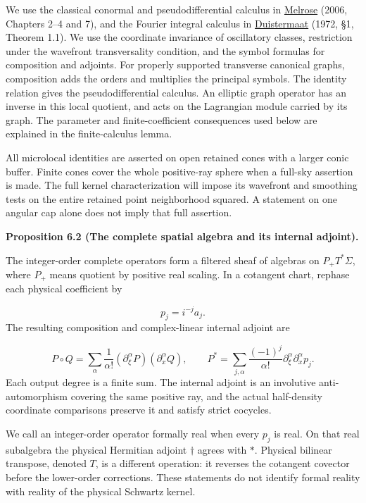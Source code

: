 \documentclass[
  english,
  11pt,
  reqno]{amsart}
\makeatletter
\newcommand{\pandocstatementheading}[1]{%
  \par\addpenalty{\@beginparpenalty}%
  \addvspace{.5\baselineskip plus .2\baselineskip minus .2\baselineskip}%
  {\normalfont\bfseries #1\par}%
  \nobreak\@afterindenttrue\@afterheading
}
\makeatother
\begin{document}
We use the classical conormal and pseudodifferential calculus in
\hyperref[ref-Melrose2006]{Melrose} (2006, Chapters 2--4 and 7), and the
Fourier integral calculus in
\hyperref[ref-Duistermaat1972FIO]{Duistermaat} (1972, §1, Theorem 1.1).
We use the coordinate invariance of oscillatory classes, restriction
under the wavefront transversality condition, and the symbol formulas
for composition and adjoints. For properly supported transverse
canonical graphs, composition adds the orders and multiplies the
principal symbols. The identity relation gives the pseudodifferential
calculus. An elliptic graph operator has an inverse in this local
quotient, and acts on the Lagrangian module carried by its graph. The
parameter and finite-coefficient consequences used below are explained
in the finite-calculus lemma.

All microlocal identities are asserted on open retained cones with a
larger conic buffer. Finite cones cover the whole positive-ray sphere
when a full-sky assertion is made. The full kernel characterization will
impose its wavefront and smoothing tests on the entire retained point
neighborhood squared. A statement on one angular cap alone does not
imply that full assertion.

\pandocstatementheading{\leavevmode{}\label{prop:online-formal-symbol-algebra}Proposition 6.2 (The complete spatial algebra and its internal adjoint).}

The integer-order complete operators form a filtered sheaf of algebras
on \(P_+T^*\Sigma\), where \(P_+\) means quotient by positive real
scaling. In a cotangent chart, rephase each physical coefficient by

\label{eq:online-symbol-degree-rephasing} \[
p_j=i^{-j}a_j.
\] The resulting composition and complex-linear internal adjoint are

\label{eq:online-formal-product-and-adjoint} \[
P\circ Q=
\sum_\alpha\frac1{\alpha!}
(\partial_\xi^\alpha P)(\partial_x^\alpha Q),
\qquad
P^*=
\sum_{j,\alpha}\frac{(-1)^j}{\alpha!}
\partial_\xi^\alpha\partial_x^\alpha p_j.
\] Each output degree is a finite sum. The internal adjoint is an
involutive anti-automorphism covering the same positive ray, and the
actual half-density coordinate comparisons preserve it and satisfy
strict cocycles.

We call an integer-order operator formally real when every \(p_j\) is
real. On that real subalgebra the physical Hermitian adjoint \(\dagger\)
agrees with \(*\). Physical bilinear transpose, denoted \(T\), is a
different operation: it reverses the cotangent covector before the
lower-order corrections. These statements do not identify formal reality
with reality of the physical Schwartz kernel.
\end{document}
